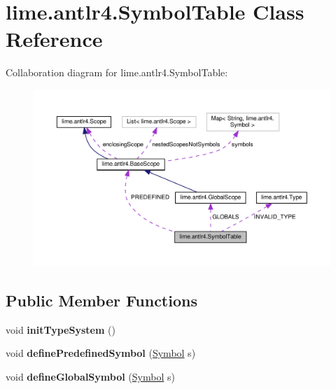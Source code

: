 \hypertarget{classlime_1_1antlr4_1_1SymbolTable}{}\section{lime.\+antlr4.\+Symbol\+Table Class Reference}
\label{classlime_1_1antlr4_1_1SymbolTable}


Collaboration diagram for lime.\+antlr4.\+Symbol\+Table\+:
\nopagebreak
\begin{figure}[H]
\begin{center}
\leavevmode
\includegraphics[width=350pt]{classlime_1_1antlr4_1_1SymbolTable__coll__graph}
\end{center}
\end{figure}
\subsection*{Public Member Functions}
\begin{DoxyCompactItemize}
\item 
\mbox{\label{classlime_1_1antlr4_1_1SymbolTable_a27f190e7d7fe7cf06200de4c74b2c639}} 
void {\bfseries init\+Type\+System} ()
\item 
\mbox{\label{classlime_1_1antlr4_1_1SymbolTable_a9af67845f1fe3396ed6d357afa5c492e}} 
void {\bfseries define\+Predefined\+Symbol} (\hyperlink{interfacelime_1_1antlr4_1_1Symbol}{Symbol} s)
\item 
\mbox{\label{classlime_1_1antlr4_1_1SymbolTable_a45cc089feae931761e21573b2552fc0c}} 
void {\bfseries define\+Global\+Symbol} (\hyperlink{interfacelime_1_1antlr4_1_1Symbol}{Symbol} s)
\end{DoxyCompactItemize}

